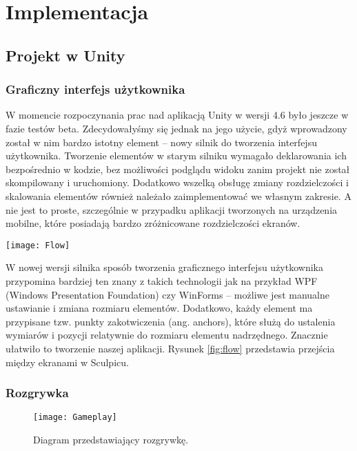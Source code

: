 \chapter{Implementacja}
\section{Projekt w Unity}
\subsection{Graficzny interfejs użytkownika}
W momencie rozpoczynania prac nad aplikacją Unity w wersji 4.6 było jeszcze w fazie testów beta. Zdecydowałyśmy się jednak na jego użycie, gdyż wprowadzony został w nim bardzo istotny element – nowy silnik do tworzenia interfejsu użytkownika. Tworzenie elementów w starym silniku wymagało deklarowania ich bezpośrednio w kodzie, bez możliwości podglądu widoku zanim projekt nie został skompilowany i uruchomiony. Dodatkowo wszelką obsługę zmiany rozdzielczości i skalowania elementów również należało zaimplementować we własnym zakresie. A nie jest to proste, szczególnie w przypadku aplikacji tworzonych na urządzenia mobilne, które posiadają bardzo zróżnicowane rozdzielczości ekranów.

\begin{figure*}[htbp]
    \texttt{[image: Flow]}
    \caption{Przejścia między ekranami.}
    \label{fig:flow}
\end{figure*}

W nowej wersji silnika sposób tworzenia graficznego interfejsu użytkownika przypomina bardziej ten znany z takich technologii jak na przykład WPF (Windows Presentation Foundation) czy WinForms – możliwe jest manualne ustawianie i zmiana rozmiaru elementów. Dodatkowo, każdy element ma przypisane tzw. punkty zakotwiczenia (ang. anchors), które służą do ustalenia wymiarów i pozycji relatywnie do rozmiaru elementu nadrzędnego. Znacznie ułatwiło to tworzenie naszej aplikacji. Rysunek \ref{fig:flow} przedstawia przejścia między ekranami w Sculpicu.

\subsection{Rozgrywka}
\begin{figure}[htbp]
    \texttt{[image: Gameplay]}
    \caption{Diagram przedstawiający rozgrywkę.}
    \label{fig:gameplay}
\end{figure}

